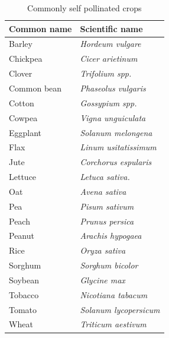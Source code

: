 \documentclass[11pt,ignorenonframetext,aspectratio=169]{beamer}
\begin{document}
\begin{frame}{}
\protect\hypertarget{section-20}{}
\begin{table}

\caption{\label{tab:predominantly-self-pollinated}Commonly self pollinated crops}
\centering
\fontsize{6}{8}\selectfont
\begin{tabular}[t]{ll}
\toprule
Common name & Scientific name\\
\midrule
Barley & \textit{Hordeum vulgare}\\
Chickpea & \textit{Cicer arietinum}\\
Clover & \textit{Trifolium spp.}\\
Common bean & \textit{Phaseolus vulgaris}\\
Cotton & \textit{Gossypium spp.}\\
\addlinespace
Cowpea & \textit{Vigna unguiculata}\\
Eggplant & \textit{Solanum melongena}\\
Flax & \textit{Linum usitatissimum}\\
Jute & \textit{Corchorus espularis}\\
Lettuce & \textit{Letuca sativa.}\\
\addlinespace
Oat & \textit{Avena sativa}\\
Pea & \textit{Pisum sativum}\\
Peach & \textit{Prunus persica}\\
Peanut & \textit{Arachis hypogaea}\\
Rice & \textit{Oryza sativa}\\
\addlinespace
Sorghum & \textit{Sorghum bicolor}\\
Soybean & \textit{Glycine max}\\
Tobacco & \textit{Nicotiana tabacum}\\
Tomato & \textit{Solanum lycopersicum}\\
Wheat & \textit{Triticum aestivum}\\
\bottomrule
\end{tabular}
\end{table}
\end{frame}
\end{document}
